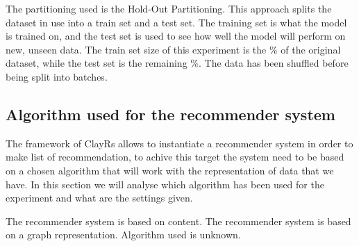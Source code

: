 \documentclass[11pt]{article}
\begin{document}
The partitioning used is the Hold-Out Partitioning.
This approach splits the dataset in use into a train set and a test set.
The training set is what the model is trained on, and the test set is used to see how
well the model will perform on new, unseen data.
\hfill\break
\hfill\break
The train set size of this experiment is the \%
of the original dataset, while the test set is the remaining \%.
\hfill\break
\hfill\break
{}
The data has been shuffled before being split into batches.
\hfill\break
\hfill\break

\subsection{Algorithm used for the recommender system}\label{subsec:algo}
The framework of ClayRs allows to instantiate a recommender system in order to make list of recommendation, to achive
this target the system need to be based on a chosen algorithm that will work with the representation of data that
we have.
In this section we will analyse which algorithm has been used for the experiment and what are the settings
given.
\hfill\break
\hfill\break

The recommender system is based on content.
\hfill\break
\hfill\break
{}
The recommender system is based on a graph representation.
\hfill\break
\hfill\break
{}
Algorithm used is unknown.
\hfill\break
\hfill\break
\end{document}
